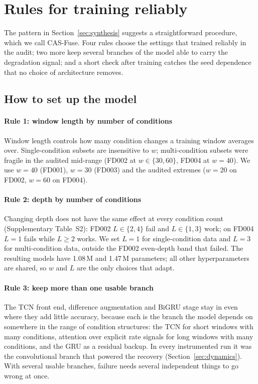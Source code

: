 \section{Rules for training reliably}
\label{sec:method}

The pattern in Section~\ref{sec:synthesis} suggests a straightforward
procedure, which we call CAS-Fuse. Four rules choose the settings that
trained reliably in the audit; two more keep several branches of the model
able to carry the degradation signal; and a short check after training
catches the seed dependence that no choice of architecture removes.

\subsection{How to set up the model}

\paragraph{Rule 1: window length by number of conditions} Window length
controls how many condition changes a training window averages over.
Single-condition subsets are insensitive to $w$; multi-condition subsets
were fragile in the audited mid-range (FD002 at $w\in\{30,60\}$, FD004 at
$w{=}40$). We use $w=40$ (FD001), $w=30$ (FD003) and the audited extremes
($w=20$ on FD002, $w=60$ on FD004).

\paragraph{Rule 2: depth by number of conditions} Changing depth does not
have the same effect at every condition count (Supplementary Table~S2):
FD002 $L\in\{2,4\}$ fail and $L\in\{1,3\}$ work; on FD004 $L{=}1$ fails
while $L\geq2$ works. We set $L=1$ for single-condition data and $L=3$ for
multi-condition data, outside the FD002 even-depth band that failed. The
resulting models have 1.08\,M and 1.47\,M parameters; all other
hyperparameters are shared, so $w$ and $L$ are the only choices that adapt.

\paragraph{Rule 3: keep more than one usable branch} The TCN front end,
difference augmentation and BiGRU stage stay in even where they add little
accuracy, because each is the branch the model depends on somewhere in the
range of condition structures: the TCN for short windows with many
conditions, attention over explicit rate signals for long windows with many
conditions, and the GRU as a residual backup. In every instrumented run it
was the convolutional branch that powered the recovery
(Section~\ref{sec:dynamics}). With several usable branches, failure needs
several independent things to go wrong at once.

